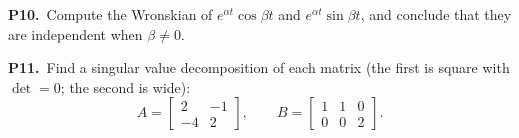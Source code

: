\documentclass[10pt]{scrartcl}
\begin{document}
\begin{prob}
  \textbf{P10.}\ Compute the Wronskian of $e^{\alpha t}\cos\beta t$ and $e^{\alpha t}\sin\beta t$, and conclude that they are independent when $\beta\neq 0$.
\end{prob}
\begin{prob}
  \textbf{P11.}\ Find a singular value decomposition of each matrix (the first is square with $\det=0$; the second is wide):
  \[
    A=\begin{bmatrix}2&-1\\-4&2\end{bmatrix},\qquad B=\begin{bmatrix}1&1&0\\0&0&2\end{bmatrix}.
  \]
\end{prob}
\end{document}
